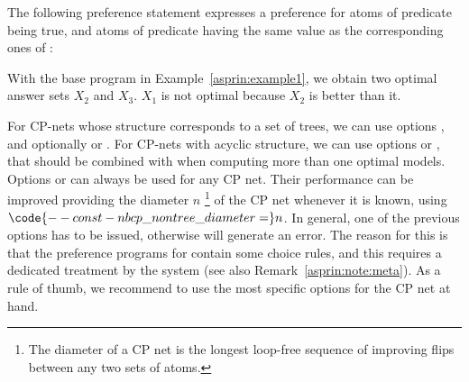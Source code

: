 \begin{example}
%
%
The following preference statement expresses a preference for atoms of predicate  being true,
and atoms of predicate  having the same value as the corresponding ones of :
%

%
With the base program in Example~\ref{asprin:example1},
we obtain two optimal answer sets $X_2$ and $X_3$.
%
$X_1$ is not optimal because $X_2$ is better than it.
\end{example} %

\begin{note}
For CP-nets whose structure corresponds to a set of trees,
we can use options , 
and optionally \code{--approximation=weak} or .
%
For CP-nets with acyclic structure,
we can use options  or , 
that should be combined with  when computing more than one optimal models.
%
Options \code{--meta=simple} or \code{--meta=combine} can always be used for any CP net. 
Their performance can be improved providing the diameter $n$%
\footnote{The diameter of a CP net is the longest loop-free sequence of improving flips
between any two sets of atoms.}
of the CP net whenever it is known,
using $\code{--const-nb cp\_nontree\_diameter=}n$.
%
In general, one of the previous options has to be issued,
otherwise  will generate an error.
%
The reason for this is that the preference programs for  contain some choice rules,
and this requires a dedicated treatment by the system (see also Remark~\ref{asprin:note:meta}).
%
As a rule of thumb,
we recommend to use the most specific options for the CP net at hand.
\end{note}


